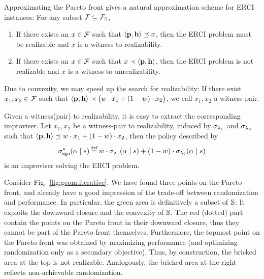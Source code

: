 \noindent
Approximating the Pareto front gives a natural approximation
scheme for ERCI instances: For any subset $\mathcal{F}_{} \subseteq
\mathcal{F}_{\mathbb{S}}$,
\begin{enumerate}
\item If there exists an $x \in \mathcal{F}_{}$ such that
$\langle \mathbf{p}, \mathbf{h} \rangle \preceq x$, then the ERCI
problem must be realizable and $x$ is a witness to realizability.
\item If there exists an $x \in \mathcal{F}_{}$
such that $x \prec \langle \mathbf{p}, \mathbf{h} \rangle$, then the
ERCI problem is not realizable and $x$ is a witness to unrealizability.
\end{enumerate}
Due to convexity, we may speed up the search for realizability: If there exist $x_1, x_2 \in \mathcal{F}_{}$ such that $\langle \mathbf{p}, \mathbf{h} \rangle \prec \big(w \cdot x_1 + (1-w) \cdot x_2\big)$, we call $x_1,x_2$ a witness-pair.
\begin{remark}
Given a witness(pair) to realizability, it is easy to extract the corresponding improviser. Let $x_1,x_2$ be a witness-pair to realizability,  induced by $\sigma_{\lambda_1}$ and $\sigma_{\lambda_2}$ such that $\langle\mathbf{p}, \mathbf{h}\rangle\preceq w\cdot x_1 + (1-w)\cdot x_2$, then the policy described by  	
\begin{equation}\label{eq:4}
  \sigma^*_\pOne(\act \mid s) \eqdef w\cdot \sched_{\rat_1}(\act \mid s) + (1-w) \cdot \sched_{\rat_2}(\act  \mid s)
\end{equation}
is an improviser solving the ERCI problem.
\end{remark}


\begin{example}
\label{ex:approximation}
	Consider Fig.~\ref{fig:geom:iterative}. We have found three points on the Pareto front, and already have a good impression of the trade-off between randomization and performance. In particular, the green area is definitively a subset of $\mathbb{S}$: It exploits the downward closure and the convexity of $\mathbb{S}$. The red (dotted) part contain the points on the Pareto front in their downward closure, thus they cannot be part of the Pareto front themselves.
	Furthermore, the topmost point on the Pareto front was obtained by maximizing performance (and optimizing randomization only as a secondary objective). Thus, by construction, the bricked area at the top is not realizable. Analogously, the bricked area at the right reflects non-achievable randomization. 
\end{example}


